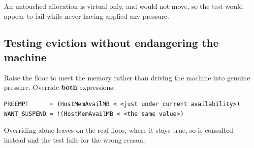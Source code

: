 An untouched allocation is virtual only, and  would not move,
so the test would appear to fail while never having applied any pressure.

\subsection{Testing eviction without endangering the machine}

Raise the floor to meet the memory rather than driving the machine into genuine
pressure. Override \textbf{both} expressions:

\begin{lstlisting}
PREEMPT      = (HostMemAvailMB < <just under current availability>)
WANT_SUSPEND = !(HostMemAvailMB < <the same value>)
\end{lstlisting}

Overriding  alone leaves  on the real floor, where
it stays true, so  is consulted instead and the test fails for the
wrong reason.
